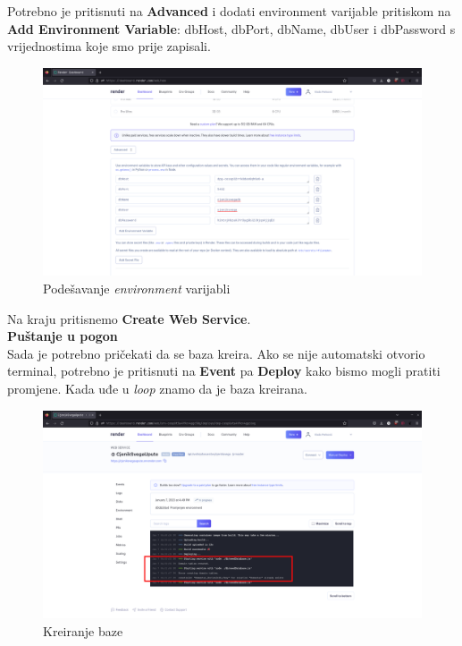 			Potrebno je pritisnuti na \textbf{Advanced} i dodati environment varijable pritiskom na \textbf{Add Environment Variable}: dbHost, dbPort, dbName, dbUser i dbPassword s vrijednostima koje smo prije zapisali.
			\begin{figure}[H]
			\includegraphics[width=\textwidth]{slike/envvar.png} %
			\caption{Podešavanje \textit{environment} varijabli}
			\label{fig:envvar} %
			\end{figure}
			Na kraju pritisnemo \textbf{Create Web Service}.\\
			
			
			\textbf{Puštanje u pogon}\\
			
			
			Sada je potrebno pričekati da se baza kreira. Ako se nije automatski otvorio terminal, potrebno je pritisnuti na \textbf{Event} pa \textbf{Deploy} kako bismo mogli pratiti promjene. Kada uđe u \textit{loop} znamo da je baza kreirana.
			
			\begin{figure}[H]
			\includegraphics[width=\textwidth]{slike/seeddb.png} %
			\caption{Kreiranje baze}
			\label{fig:seeddb} %
			\end{figure}
			
